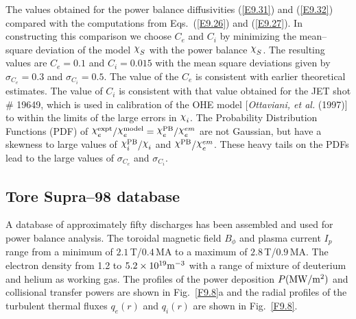 \documentclass[a4paper,openany,12pt]{book}
\def\chix{\raise.5ex\hbox{$\chi$}}
\begin{document}
The values obtained for the power balance diffusivities (\ref{E9.31}) and (\ref{E9.32}) compared with the computations from Eqs.~(\ref{E9.26}) and (\ref{E9.27}). In constructing this comparison we choose $C_e$ and $C_i$ by minimizing the mean--square deviation of the model $\chix_S$ with the power balance $\chix_S$. The resulting values are $C_e=0.1$ and $C_i=0.015$ with the mean square deviations given by $\sigma_{C_e}=0.3$ and $\sigma_{C_i}=0.5$. The value of the $C_e$ is consistent with earlier theoretical estimates. The value of $C_i$ is consistent with that value obtained for the JET shot \# 19649, which is used in calibration of the OHE model [\emph{Ottaviani, et al.} (1997)] to within the limits of the large errors in $\chix_i$. The Probability Distribution Functions (PDF) of $\chix_e^{\rm expt}/\chix_e^{\rm model}=\chix_e^{\rm PB}/\chix_e^{em}$ are not Gaussian, but have a skewness to large values of $\chix_i^{\rm PB}/\chix_i$ and $\chix^{\rm PB}/\chix_e^{em}$. These heavy tails on the PDFs lead to the large values of $\sigma_{C_e}$ and $\sigma_{C_i}$.

\subsection{Tore Supra--98 database}

A database of approximately fifty discharges has been assembled and used for power 
balance analysis. The toroidal magnetic field $B_\phi$ and plasma current $I_p$ range from a minimum of $2.1\,$T/$0.4\,$MA to a maximum of $2.8\,$T/$0.9\,$MA. The electron density from 1.2 to $5.2\times 10^{19}\rm m^{-3}$ with a range of mixture of deuterium and helium as working gas. The profiles of the power deposition $P(\rm MW/m^2)$ and collisional transfer powers are shown in Fig.~\ref{F9.8}a and the radial profiles of the turbulent thermal fluxes $q_e(r)$ and $q_i(r)$ are shown in Fig.~\ref{F9.8}.
\end{document}

